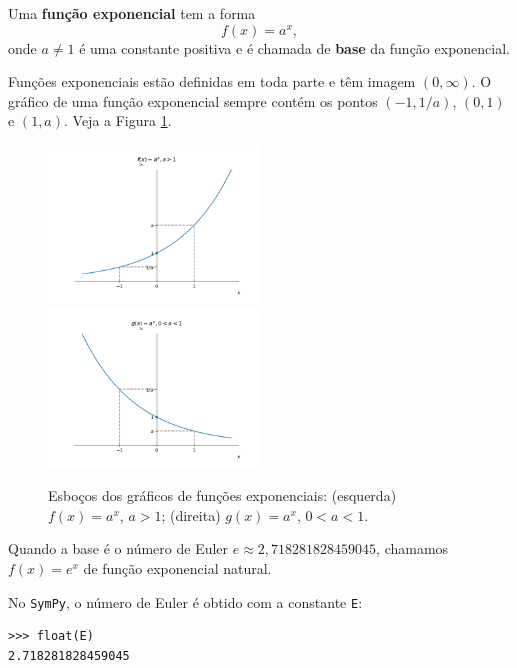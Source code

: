 Uma {\bf função exponencial} tem a forma
\begin{equation}
  f(x) = a^x,
\end{equation}
onde $a\neq 1$ é uma constante positiva e é chamada de {\bf base} da função exponencial.

Funções exponenciais estão definidas em toda parte e têm imagem $(0, \infty)$. O gráfico de uma função exponencial sempre contém os pontos $(-1,1/a)$, $(0,1)$ e $(1,a)$. Veja a Figura \ref{fig:exponencial_graficos}.

\begin{figure}[H]
  \centering
  \includegraphics[width=0.5\textwidth]{./cap_funcao/dados/fig_exponencial_graficos/fig_exponencial_2}~
  \includegraphics[width=0.5\textwidth]{./cap_funcao/dados/fig_exponencial_graficos/fig_exponencial_12}
  \caption{Esboços dos gráficos de funções exponenciais: (esquerda) $f(x) = a^x$, $a>1$; (direita) $g(x) = a^x$, $0<a<1$.}
  \label{fig:exponencial_graficos}
\end{figure}

\begin{obs}
  Quando a base é o número de Euler $e \approx 2,718281828459045$, chamamos $f(x) = e^x$ de função exponencial natural.

  \ifispython
  No \verb+SymPy+, o número de Euler é obtido com a constante \verb+E+:
\begin{verbatim}
>>> float(E)
2.718281828459045
\end{verbatim}
  \fi
\end{obs}

